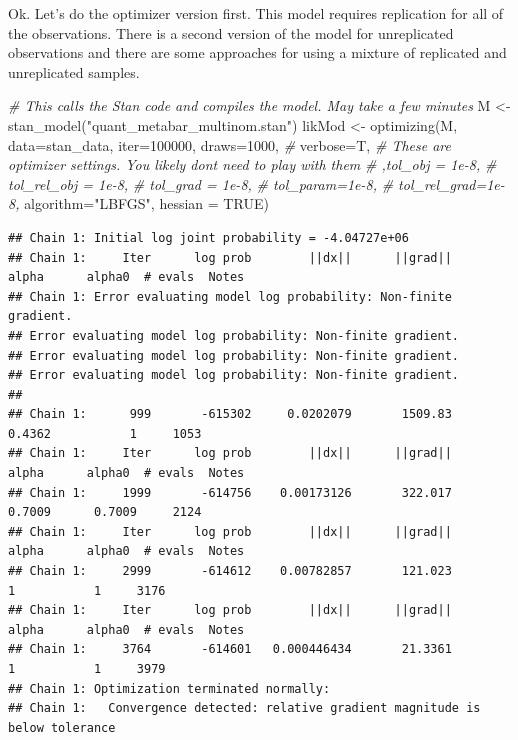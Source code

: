 \documentclass[
]{article}
\newenvironment{Shaded}{\begin{snugshade}}{\end{snugshade}}
\newcommand{\AttributeTok}[1]{\textcolor[rgb]{0.77,0.63,0.00}{#1}}
\newcommand{\CommentTok}[1]{\textcolor[rgb]{0.56,0.35,0.01}{\textit{#1}}}
\newcommand{\ConstantTok}[1]{\textcolor[rgb]{0.00,0.00,0.00}{#1}}
\newcommand{\DecValTok}[1]{\textcolor[rgb]{0.00,0.00,0.81}{#1}}
\newcommand{\FunctionTok}[1]{\textcolor[rgb]{0.00,0.00,0.00}{#1}}
\newcommand{\NormalTok}[1]{#1}
\newcommand{\OtherTok}[1]{\textcolor[rgb]{0.56,0.35,0.01}{#1}}
\newcommand{\StringTok}[1]{\textcolor[rgb]{0.31,0.60,0.02}{#1}}
\begin{document}
Ok. Let's do the optimizer version first. This model requires
replication for all of the observations. There is a second version of
the model for unreplicated observations and there are some approaches
for using a mixture of replicated and unreplicated samples.

\begin{Shaded}
\begin{Highlighting}[]
  \CommentTok{\# This calls the Stan code and compiles the model.  May take a few minutes}
\NormalTok{ M }\OtherTok{\textless{}{-}} \FunctionTok{stan\_model}\NormalTok{(}\StringTok{"quant\_metabar\_multinom.stan"}\NormalTok{)}
\NormalTok{ likMod }\OtherTok{\textless{}{-}} \FunctionTok{optimizing}\NormalTok{(M, }\AttributeTok{data=}\NormalTok{stan\_data, }\AttributeTok{iter=}\DecValTok{100000}\NormalTok{,}
                      \AttributeTok{draws=}\DecValTok{1000}\NormalTok{, }\CommentTok{\# }
                      \AttributeTok{verbose=}\NormalTok{T,}
\CommentTok{\# These are optimizer settings.  You likely don\textquotesingle{}t need to play with them}
                      \CommentTok{\# ,tol\_obj = 1e{-}8,}
                      \CommentTok{\# tol\_rel\_obj = 1e{-}8,}
                      \CommentTok{\# tol\_grad = 1e{-}8,}
                      \CommentTok{\# tol\_param=1e{-}8,}
                      \CommentTok{\# tol\_rel\_grad=1e{-}8,}
                      \AttributeTok{algorithm=}\StringTok{"LBFGS"}\NormalTok{,}
                      \AttributeTok{hessian =} \ConstantTok{TRUE}\NormalTok{)}
\end{Highlighting}
\end{Shaded}

\begin{verbatim}
## Chain 1: Initial log joint probability = -4.04727e+06
## Chain 1:     Iter      log prob        ||dx||      ||grad||       alpha      alpha0  # evals  Notes 
## Chain 1: Error evaluating model log probability: Non-finite gradient.
## Error evaluating model log probability: Non-finite gradient.
## Error evaluating model log probability: Non-finite gradient.
## Error evaluating model log probability: Non-finite gradient.
## 
## Chain 1:      999       -615302     0.0202079       1509.83      0.4362           1     1053   
## Chain 1:     Iter      log prob        ||dx||      ||grad||       alpha      alpha0  # evals  Notes 
## Chain 1:     1999       -614756    0.00173126       322.017      0.7009      0.7009     2124   
## Chain 1:     Iter      log prob        ||dx||      ||grad||       alpha      alpha0  # evals  Notes 
## Chain 1:     2999       -614612    0.00782857       121.023           1           1     3176   
## Chain 1:     Iter      log prob        ||dx||      ||grad||       alpha      alpha0  # evals  Notes 
## Chain 1:     3764       -614601   0.000446434       21.3361           1           1     3979   
## Chain 1: Optimization terminated normally: 
## Chain 1:   Convergence detected: relative gradient magnitude is below tolerance
\end{verbatim}
\end{document}
